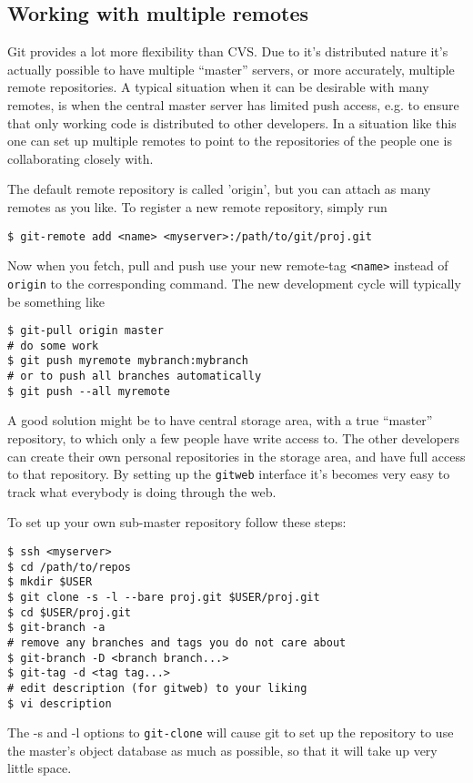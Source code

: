 \documentclass[a4paper,10pt]{article}
\begin{document}
\subsection{Working with multiple remotes}
\label{sec:remotes}
Git provides a lot more flexibility than CVS. Due to it's distributed nature
it's actually possible to have multiple ``master'' servers, or more
accurately, multiple remote repositories. 
A typical situation when it can be desirable with many remotes, is when the
central master server has limited push access, e.g. to ensure that only
working code is distributed to other developers. In a situation like this one
can set up multiple remotes to point to the repositories of the
people one is collaborating closely with.

The default remote repository is
called 'origin', but you can attach as many remotes as you like. To register a
new remote repository, simply run
\begin{verbatim}
$ git-remote add <name> <myserver>:/path/to/git/proj.git
\end{verbatim}

Now when you fetch, pull and push use your new remote-tag {\tt <name>} instead 
of {\tt origin} to the corresponding command. The new development cycle will
typically be something like
\begin{verbatim}
$ git-pull origin master
# do some work
$ git push myremote mybranch:mybranch
# or to push all branches automatically
$ git push --all myremote 
\end{verbatim}

A good solution might be to have central storage area, with a true ``master'' 
repository, to which only a few people have write access to. The other
developers can create their own personal repositories in the storage area, and
have full access to that repository. By setting up the \texttt{gitweb}
interface it's becomes very easy to track what everybody is doing through 
the web.

To set up your own sub-master repository follow these steps:
\begin{verbatim}
$ ssh <myserver>
$ cd /path/to/repos
$ mkdir $USER
$ git clone -s -l --bare proj.git $USER/proj.git
$ cd $USER/proj.git 
$ git-branch -a 
# remove any branches and tags you do not care about
$ git-branch -D <branch branch...>
$ git-tag -d <tag tag...>
# edit description (for gitweb) to your liking 
$ vi description
\end{verbatim}
The -s and -l options to {\tt git-clone} will cause git to set up the
repository to use the master's object database as much as possible, so that it
will take up very little space. 
\end{document}
